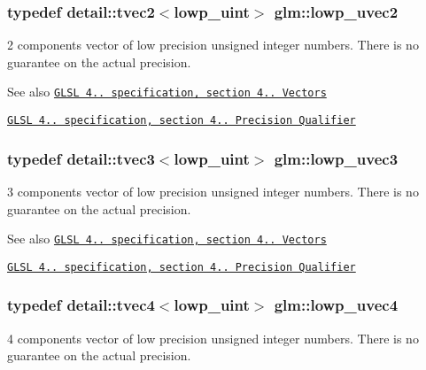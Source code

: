 \subsubsection[{lowp\+\_\+uvec2}]{\setlength{\rightskip}{0pt plus 5cm}typedef detail\+::tvec2$<$lowp\+\_\+uint$>$ {\bf glm\+::lowp\+\_\+uvec2}}\label{group__core__precision_gacae56e02818d0da34e70ac934807388c}
2 components vector of low precision unsigned integer numbers. There is no guarantee on the actual precision.

\begin{DoxySeeAlso}{See also}
\href{http://www.opengl.org/registry/doc/GLSLangSpec.4.20.8.pdf}{\tt G\+L\+S\+L 4.. specification, section 4.. Vectors} 

\href{http://www.opengl.org/registry/doc/GLSLangSpec.4.20.8.pdf}{\tt G\+L\+S\+L 4.. specification, section 4.. Precision Qualifier} 
\end{DoxySeeAlso}
\hypertarget{group__core__precision_ga45a3d9b09e9077ea280d8a1d599c7cae}{}
\subsubsection[{lowp\+\_\+uvec3}]{\setlength{\rightskip}{0pt plus 5cm}typedef detail\+::tvec3$<$lowp\+\_\+uint$>$ {\bf glm\+::lowp\+\_\+uvec3}}\label{group__core__precision_ga45a3d9b09e9077ea280d8a1d599c7cae}
3 components vector of low precision unsigned integer numbers. There is no guarantee on the actual precision.

\begin{DoxySeeAlso}{See also}
\href{http://www.opengl.org/registry/doc/GLSLangSpec.4.20.8.pdf}{\tt G\+L\+S\+L 4.. specification, section 4.. Vectors} 

\href{http://www.opengl.org/registry/doc/GLSLangSpec.4.20.8.pdf}{\tt G\+L\+S\+L 4.. specification, section 4.. Precision Qualifier} 
\end{DoxySeeAlso}
\hypertarget{group__core__precision_gae312816bc8b9b803de46b9fb2da036eb}{}
\subsubsection[{lowp\+\_\+uvec4}]{\setlength{\rightskip}{0pt plus 5cm}typedef detail\+::tvec4$<$lowp\+\_\+uint$>$ {\bf glm\+::lowp\+\_\+uvec4}}\label{group__core__precision_gae312816bc8b9b803de46b9fb2da036eb}
4 components vector of low precision unsigned integer numbers. There is no guarantee on the actual precision.

